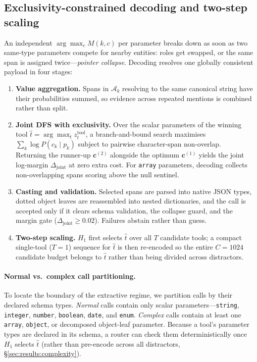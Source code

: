 \subsection{Exclusivity-constrained decoding and two-step scaling}
\label{sec:method:decode}

An independent $\arg\max_c M(k, c)$ per parameter breaks down as soon as two same-type parameters compete for nearby entities: roles get swapped, or the same span is assigned twice---\emph{pointer collapse}. Decoding resolves one globally consistent payload in four stages:
\begin{enumerate}
    \item \textbf{Value aggregation.} Spans in $\mathcal{A}_k$ resolving to the same canonical string have their probabilities summed, so evidence across repeated mentions is combined rather than split.
    \item \textbf{Joint DFS with exclusivity.} Over the scalar parameters of the winning tool $\hat{t} = \arg\max_t z_t^{\text{tool}}$, a branch-and-bound search maximises $\sum_k \log P(c_k \mid p_k)$ subject to pairwise character-span non-overlap. Returning the runner-up $\mathbf{c}^{(2)}$ alongside the optimum $\mathbf{c}^{(1)}$ yields the joint log-margin $\Delta_{\text{joint}}$ at zero extra cost. For \texttt{array} parameters, decoding collects non-overlapping spans scoring above the null sentinel.
    \item \textbf{Casting and validation.} Selected spans are parsed into native JSON types, dotted object leaves are reassembled into nested dictionaries, and the call is accepted only if it clears schema validation, the collapse guard, and the margin gate ($\Delta_{\text{joint}} \ge 0.02$). Failures abstain rather than guess.
    \item \textbf{Two-step scaling.} $H_1$ first selects $\hat{t}$ over all $T$ candidate tools; a compact single-tool ($T{=}1$) sequence for $\hat{t}$ is then re-encoded so the entire $C{=}1024$ candidate budget belongs to $\hat{t}$ rather than being divided across distractors.
\end{enumerate}

\paragraph{Normal vs.\ complex call partitioning.}
To locate the boundary of the extractive regime, we partition calls by their declared schema types. \emph{Normal} calls contain only scalar parameters---\texttt{string}, \texttt{integer}, \texttt{number}, \texttt{boolean}, \texttt{date}, and \texttt{enum}. \emph{Complex} calls contain at least one \texttt{array}, \texttt{object}, or decomposed object-leaf parameter. Because a tool's parameter types are declared in its schema, a router can check them deterministically once $H_1$ selects $\hat{t}$ (rather than pre-encode across all distractors, \S\ref{sec:results:complexity}).

